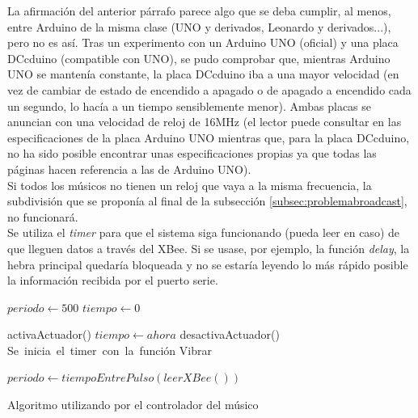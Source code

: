 La afirmación del anterior párrafo parece algo que se deba cumplir, al menos, entre
Arduino de la misma clase (UNO y derivados, Leonardo y derivados...), pero no es así.
Tras un experimento con un Arduino UNO (oficial) y una placa DCcduino (compatible con UNO),
se pudo comprobar que, mientras Arduino UNO se mantenía constante, la placa DCcduino iba a una
mayor velocidad (en vez de cambiar de estado de encendido a apagado o de apagado a encendido
cada un segundo, lo hacía a un tiempo sensiblemente menor). Ambas placas se anuncian
con una velocidad de reloj de 16MHz (el lector puede consultar en \cite{arduinoUNO} las
especificaciones de la placa Arduino UNO mientras que, para la placa DCcduino, no ha sido
posible encontrar unas especificaciones propias ya que todas las páginas hacen referencia
a las de Arduino UNO).\\

Si todos los músicos no tienen un reloj que vaya a la misma frecuencia,
la subdivisión que se proponía al final de la subsección \ref{subsec:problemabroadcast},
no funcionará.\\

Se utiliza el \textit{timer} para que el sistema siga funcionando (pueda leer en caso)
de que lleguen datos a través del XBee. Si se usase, por ejemplo, la función \textit{delay},
la hebra principal quedaría bloqueada y no se estaría leyendo lo más rápido posible
la información recibida por el puerto serie.\\

\begin{algorithm}
  \begin{algorithmic}[1]
    \State $periodo\gets 500$
    \State $tiempo\gets 0$

       \State activaActuador()
       \State $tiempo \gets ahora$
      \Else {}
        \State desactivaActuador()
         \EndIf
     \EndIf
     \EndFunction\\

     \State Se\ inicia\ el\ timer\ con\ la\ función Vibrar

         \State $periodo\gets tiempoEntrePulso(leerXBee())$
      \EndIf
     \EndWhile
  \end{algorithmic}
  \caption{Algoritmo utilizando por el controlador del músico}
\end{algorithm}

